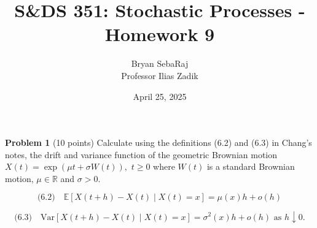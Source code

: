\documentclass{article}
\title{S\&DS 351: Stochastic Processes - Homework 9}
\author{Bryan SebaRaj \\[0.8em] Professor Ilias Zadik}
\date{April 25, 2025}
\begin{document}
\maketitle

\textbf{Problem 1}   (10 points) Calculate using the definitions (6.2) and (6.3) in Chang’s notes, the drift and variance function of the geometric Brownian motion 
$X(t) = \exp(\mu t + \sigma W(t)),$
$t \geq 0$ where $W(t)$ is a standard Brownian motion, $\mu \in \mathbb{R}$ and $\sigma > 0$.

%
\begin{equation*}
\text{(6.2)} \quad \mathbb{E}[X(t+h) - X(t) \mid X(t) = x] = \mu(x)h + o(h)
\end{equation*}

\begin{equation*}
    \text{(6.3)} \quad \text{Var}[X(t+h) - X(t) \mid X(t) = x] = \sigma^2(x)h + o(h) \text{ as } h \downarrow 0.
\end{equation*}
\end{document}
